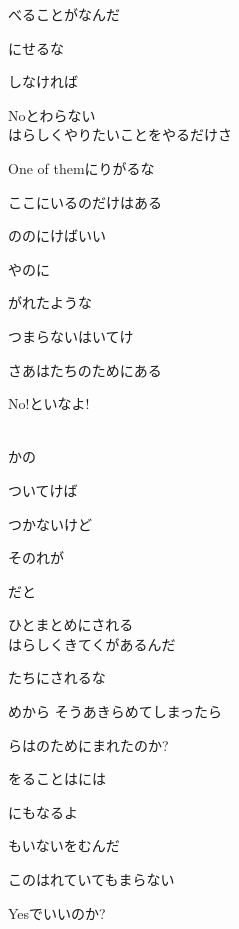 べることがなんだ

にせるな

しなければ

Noとわらない
\\

はらしくやりたいことをやるだけさ

One of themにりがるな

ここにいるのだけはある

ののにけばいい

やのに

がれたような

つまらないはいてけ

さあはたちのためにある

No!といなよ!

\\

かの

ついてけば

つかないけど

そのれが

だと

ひとまとめにされる
\\

はらしくきてくがあるんだ

たちにされるな

めから そうあきらめてしまったら

らはのためにまれたのか?

をることはには

にもなるよ

もいないをむんだ

このはれていてもまらない

Yesでいいのか?

\\
